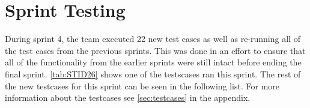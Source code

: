 

\section{Sprint Testing}
\label{sec:sp4test}

During sprint 4, the team executed 22 new test cases as well as re-running all of the test cases from the previous sprints. This was done in an effort to ensure that all of the functionality from the earlier sprints were still intact before ending the final sprint. \autoref{tab:STID26} shows one of the testscases ran this sprint. The rest of the new testcases for this sprint can be seen in the following list. For more information about the testcases see \autoref{sec:testcases} in the appendix.

